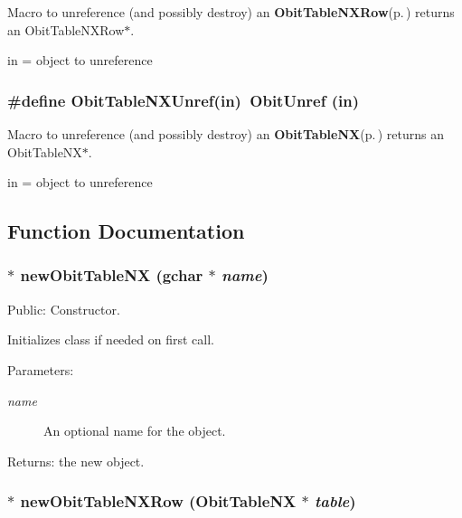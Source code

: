 Macro to unreference (and possibly destroy) an {\bf Obit\-Table\-NXRow}{\rm (p.\,\pageref{structObitTableNXRow})} returns an Obit\-Table\-NXRow$\ast$. 

in = object to unreference 
\subsubsection{\setlength{\rightskip}{0pt plus 5cm}\#define Obit\-Table\-NXUnref(in)\ Obit\-Unref (in)}\label{ObitTableNX_8h_a1}


Macro to unreference (and possibly destroy) an {\bf Obit\-Table\-NX}{\rm (p.\,\pageref{structObitTableNX})} returns an Obit\-Table\-NX$\ast$. 

in = object to unreference 

\subsection{Function Documentation}
\subsubsection{$\ast$ new\-Obit\-Table\-NX (gchar $\ast$ {\em name})}\label{ObitTableNX_8h_a11}


Public: Constructor. 

Initializes class if needed on first call. \begin{Desc}
\item[Parameters:]
\begin{description}
\item[{\em name}]An optional name for the object. \end{description}
\end{Desc}
\begin{Desc}
\item[Returns:]the new object. \end{Desc}
\subsubsection{$\ast$ new\-Obit\-Table\-NXRow ({\bf Obit\-Table\-NX} $\ast$ {\em table})}\label{ObitTableNX_8h_a8}


